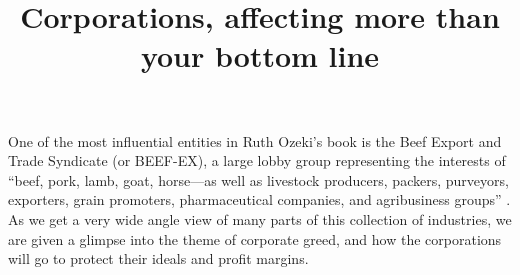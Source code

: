 \documentclass{article}
\title{Corporations, affecting more than your bottom line}
\begin{document}
\makeheader

One of the most influential entities in Ruth Ozeki's book
 is the Beef Export and Trade Syndicate (or BEEF-EX),
a large lobby group representing the interests of ``beef, pork, lamb, goat,
horse—as well as livestock producers, packers, purveyors, exporters, grain
promoters, pharmaceutical companies, and agribusiness groups''
\cite{ozeki1998my}. As we get a very wide angle view of many parts of this
collection of industries, we are given a glimpse into the theme of corporate
greed, and how the corporations will go to protect their ideals and profit
margins.


\end{document}
